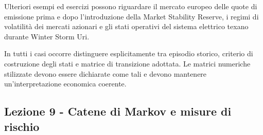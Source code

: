\documentclass[12pt,a4paper]{article}%
\newcommand{\1}{\mathbf{1}}
\begin{document}
Ulteriori esempi ed esercizi possono riguardare il mercato europeo delle
quote di emissione prima e dopo l'introduzione della Market Stability
Reserve, i regimi di volatilit\`{a} dei mercati azionari e gli stati
operativi del sistema elettrico texano durante Winter Storm Uri.

In tutti i casi occorre distinguere esplicitamente tra episodio storico,
criterio di costruzione degli stati e matrice di transizione adottata.
Le matrici numeriche stilizzate devono essere dichiarate come tali e
devono mantenere un'interpretazione economica coerente.

\subsection{Lezione 9 - Catene di Markov e misure di rischio}
\end{document}
